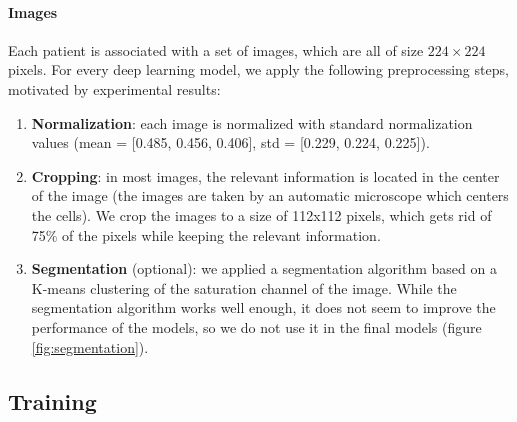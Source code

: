 \documentclass{midl}
\begin{document}
\paragraph*{Images}
Each patient is associated with a set of images, which are all of size $224\times224$ pixels. For every deep learning model, we apply the following preprocessing steps, motivated by experimental results:
\begin{enumerate}
    \setlength\itemsep{0em}
    \item \textbf{Normalization}: each image is normalized with standard normalization values (mean = [0.485, 0.456, 0.406], std = [0.229, 0.224, 0.225]).
    \item \textbf{Cropping}: in most images, the relevant information is located in the center of the image (the images are taken by an automatic microscope which centers the cells). We crop the images to a size of 112x112 pixels, which gets rid of 75\% of the pixels while keeping the relevant information.
    \item \textbf{Segmentation} (optional): we applied a segmentation algorithm based on a K-means clustering of the saturation channel of the image. While the segmentation algorithm works well enough, it does not seem to improve the performance of the models, so we do not use it in the final models (figure \ref{fig:segmentation}).
\end{enumerate}

\subsection{Training}
\end{document}
